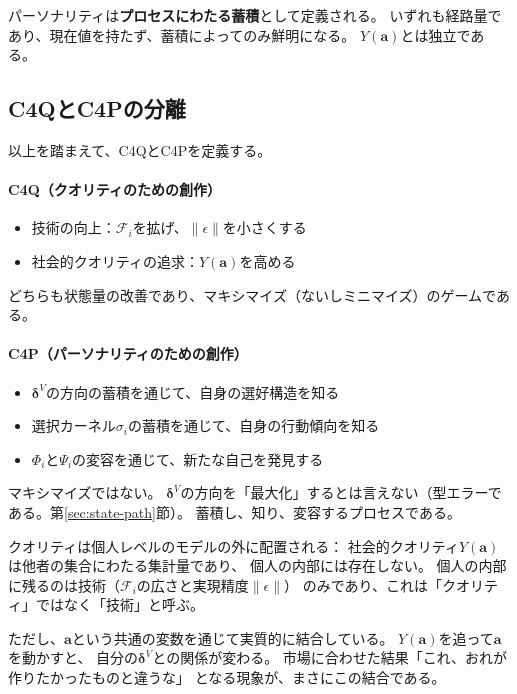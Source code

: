 \documentclass[a4paper, fontsize=10pt]{jlreq}
\newcommand{\va}{\bm{a}}
\newcommand{\Phii}{\Phi_i}
\newcommand{\Psii}{\Psi_i}
\newcommand{\Fi}{\mathcal{F}_i}
\newcommand{\dV}{\bm{\delta}^{V}}          %
\begin{document}
パーソナリティは\textbf{プロセスにわたる蓄積}として定義される。
いずれも経路量であり、現在値を持たず、蓄積によってのみ鮮明になる。
$Y(\va)$とは独立である。

\subsection{C4QとC4Pの分離}\label{subsec:separation}

以上を踏まえて、C4QとC4Pを定義する。

\paragraph{C4Q（クオリティのための創作）}
\begin{itemize}[leftmargin=2em]
  \item 技術の向上：$\Fi$を拡げ、$\lVert\epsilon\rVert$を小さくする
  \item 社会的クオリティの追求：$Y(\va)$を高める
\end{itemize}
どちらも状態量の改善であり、マキシマイズ（ないしミニマイズ）のゲームである。

\paragraph{C4P（パーソナリティのための創作）}
\begin{itemize}[leftmargin=2em]
  \item $\dV$の方向の蓄積を通じて、自身の選好構造を知る
  \item 選択カーネル$\sigma_i$の蓄積を通じて、自身の行動傾向を知る
  \item $\Phii$と$\Psii$の変容を通じて、新たな自己を発見する
\end{itemize}
マキシマイズではない。
$\dV$の方向を「最大化」するとは言えない（型エラーである。第\ref{sec:state-path}節）。
蓄積し、知り、変容するプロセスである。

\medskip

クオリティは個人レベルのモデルの外に配置される：
社会的クオリティ$Y(\va)$は他者の集合にわたる集計量であり、
個人の内部には存在しない。
個人の内部に残るのは技術（$\Fi$の広さと実現精度$\lVert\epsilon\rVert$）
のみであり、これは「クオリティ」ではなく「技術」と呼ぶ。

ただし、$\va$という共通の変数を通じて実質的に結合している。
$Y(\va)$を追って$\va$を動かすと、
自分の$\dV$との関係が変わる。
市場に合わせた結果「これ、おれが作りたかったものと違うな」
となる現象が、まさにこの結合である。
\end{document}
